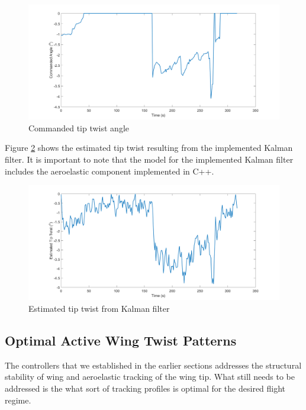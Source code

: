 \documentclass[11pt]{ucthesis}
\begin{document}
\begin{figure}[h]
\centering
\includegraphics[width=1\linewidth]{Figures/CommandedTwist.png}
\caption{Commanded tip twist angle}
\label{fig:AHilSimCMD}
\end{figure}

Figure \ref{fig:AHilSimKal} shows the estimated tip twist resulting from the implemented Kalman filter. It is important to note that the model for the implemented Kalman filter includes the aeroelastic component implemented in C++.

\begin{figure}[h]
\centering
\includegraphics[width=1\linewidth]{Figures/EstimatedTipTwist.png}
\caption{Estimated tip twist from Kalman filter}
\label{fig:AHilSimKal}
\end{figure}

\subsection{Optimal Active Wing Twist Patterns}
The controllers that we established in the earlier sections addresses the structural stability of wing and aeroelastic tracking of the wing tip. What still needs to be addressed is the what sort of tracking profiles is optimal for the desired flight regime.
\end{document}

